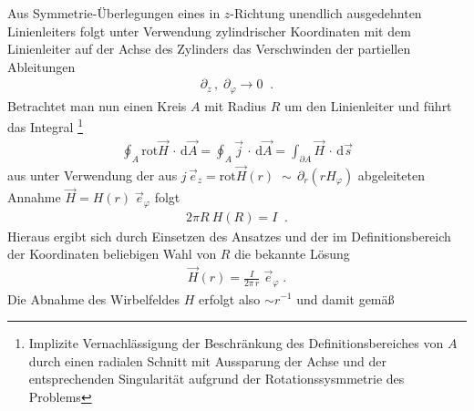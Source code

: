 \documentclass[./Protokollheft.tex]{subfiles}
\begin{document}
Aus Symmetrie-Überlegungen eines in $z$-Richtung unendlich ausgedehnten Linienleiters folgt unter Verwendung zylindrischer Koordinaten mit dem Linienleiter auf der Achse des Zylinders das Verschwinden der partiellen Ableitungen
\begin{align*}
	\partial _z \, , \; \partial _\varphi \rightarrow 0 \; \; .
\end{align*}
Betrachtet man nun einen Kreis $A$ mit Radius $R$ um den Linienleiter und führt das Integral
	 \footnote{Implizite Vernachlässigung der Beschränkung des Definitionsbereiches von $A$ durch einen radialen Schnitt mit Aussparung der Achse und der entsprechenden Singularität aufgrund der Rotationssysmmetrie des Problems}
\begin{align*}
	\oint_A \! \mathrm{rot} \vec{H} \, \cdot \, \mathrm{d} \vec{A} = 
	\oint_A \! \vec{j} \, \cdot \, \mathrm{d} \vec{A} =
	\int_{\partial A} \! \vec{H} \, \cdot \, \mathrm{d} \vec{s}
\end{align*}
aus unter Verwendung der aus $j \, \vec{e} _z = \mathrm{rot} \vec{H} \left( r \right) \; \sim \, \partial _r \left( r H_\varphi \right) $ abgeleiteten Annahme $ \vec{H} = H \left( r \right) \; \vec{e} _\varphi $ folgt
\begin{align*}
	2 \pi R \: H \left( R \right) = I \; \; .
\end{align*}
Hieraus ergibt sich durch Einsetzen des Ansatzes und der im Definitionsbereich der Koordinaten beliebigen Wahl von $R$ die bekannte Lösung
\begin{align}
	\vec{H} \left( r \right) = \frac{I}{2 \pi \, r} \; \vec{e} _\varphi \; .
\end{align}
\label{eq:v4.va9}
Die Abnahme des Wirbelfeldes $H$ erfolgt also $ \sim r^{-1} $ und damit gemäß \\
\begin{center}

\end{center}
\end{document}
